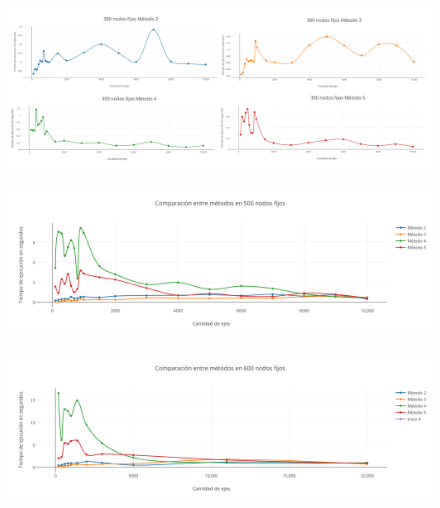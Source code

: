    \begin{figure}[h!]
   \begin{center}
 	\includegraphics[scale=0.08]{imagenes/local/tiempos/300nodos2.png}
   \end{center}
 \end{figure}



  \begin{figure}[h!]
   \begin{center}
 	\includegraphics[scale=0.55]{imagenes/local/tiempos/500nodos.png}
   \end{center}
 \end{figure}
 
\newpage 
 
   \begin{figure}[h!]
   \begin{center}
 	\includegraphics[scale=0.55]{imagenes/local/tiempos/600nodos.png}
   \end{center}
 \end{figure}

